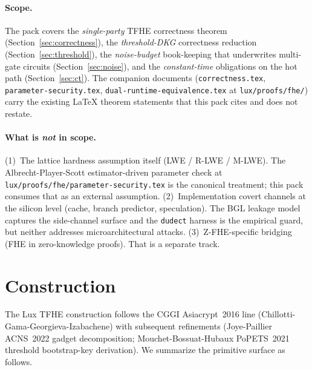 \documentclass[11pt,a4paper]{article}
\begin{document}
\paragraph{Scope.} The pack covers the \emph{single-party} TFHE
correctness theorem (Section~\ref{sec:correctness}), the
\emph{threshold-DKG} correctness reduction
(Section~\ref{sec:threshold}), the \emph{noise-budget} book-keeping
that underwrites multi-gate circuits (Section~\ref{sec:noise}), and
the \emph{constant-time} obligations on the hot path
(Section~\ref{sec:ct}). The companion documents
(\texttt{correctness.tex},
\texttt{parameter-security.tex},
\texttt{dual-runtime-equivalence.tex} at
\texttt{lux/proofs/fhe/}) carry the existing LaTeX theorem
statements that this pack cites and does not restate.

\paragraph{What is \emph{not} in scope.} (1)~The lattice hardness
assumption itself (LWE / R-LWE / M-LWE). The Albrecht-Player-Scott
estimator-driven parameter check at
\texttt{lux/proofs/fhe/parameter-security.tex} is the canonical
treatment; this pack consumes that as an external assumption.
(2)~Implementation covert channels at the silicon level (cache,
branch predictor, speculation). The BGL leakage model captures the
side-channel surface and the \texttt{dudect} harness is the
empirical guard, but neither addresses microarchitectural attacks.
(3)~Z-FHE-specific bridging (FHE in zero-knowledge proofs). That is
a separate track.

\section{Construction}\label{sec:construction}

The Lux TFHE construction follows the CGGI Asiacrypt~2016 line
(Chillotti-Gama-Georgieva-Izabachene)
with subsequent refinements
(Joye-Paillier ACNS~2022 gadget decomposition;
Mouchet-Bossuat-Hubaux PoPETS~2021 threshold bootstrap-key
derivation). We summarize the primitive surface as follows.
\end{document}
